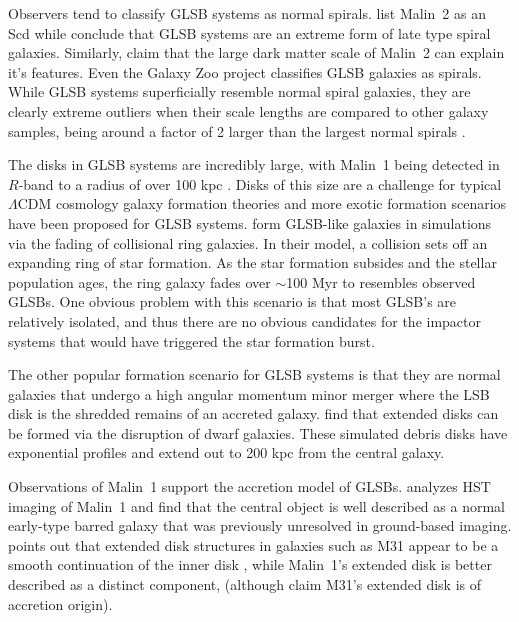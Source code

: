 \documentclass{emulateapj}
\begin{document}
Observers tend to classify GLSB systems as normal spirals.  \citet{Matthews01b} list Malin~2 as an Scd while \citet{Das13} conclude that GLSB systems are an extreme form of late type spiral galaxies.  Similarly, \citet{Kasparova14} claim that the large dark matter scale of Malin~2 can explain it's features.  Even the Galaxy Zoo project \citep{Willett13}  classifies GLSB galaxies as spirals.  While GLSB systems superficially resemble normal spiral galaxies, they are clearly extreme outliers when their scale lengths are compared to other galaxy samples, being around a factor of 2 larger than the largest normal spirals \citep[Figure~4]{Dalcanton97}. 

The disks in GLSB systems are incredibly large, with Malin~1 being detected in $R$-band to a radius of over 100 kpc \citep{Moore06}.  Disks of this size are a challenge for typical $\Lambda$CDM cosmology galaxy formation theories and more exotic formation scenarios have been proposed for GLSB systems.  \citet{Mapelli08} form GLSB-like galaxies in simulations via the fading of collisional ring galaxies.  In their model, a collision sets off an expanding ring of star formation.  As the star formation subsides and the stellar population ages, the ring galaxy fades over $\sim$100 Myr to resembles observed GLSBs.  One obvious problem with this scenario is that most GLSB's are relatively isolated, and thus there are no obvious candidates for the impactor systems that would have triggered the star formation burst.  

The other popular formation scenario for GLSB systems is that they are normal galaxies that undergo a high angular momentum minor merger where the LSB disk is the shredded remains of an accreted galaxy.  \citet{Pen06} find that extended disks can be formed via the disruption of dwarf galaxies.  These simulated debris disks have exponential profiles and extend out to 200 kpc from the central galaxy.

Observations of Malin~1 support the accretion model of GLSBs.  \citet{Barth07} analyzes HST imaging of Malin~1 and find that the central object is well described as a normal early-type barred galaxy that was previously unresolved in ground-based imaging. \citet{Barth07} points out that extended disk structures in galaxies such as M31 appear to be a smooth continuation of the inner disk \citep{Ferguson02}, while Malin~1's extended disk is better described as a distinct component, (although \citet{Ibata05} claim M31's extended disk is of accretion origin).
\end{document}
